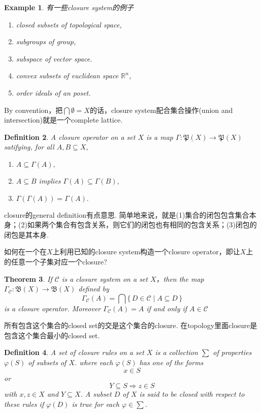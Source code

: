 \documentclass{article}
\newtheorem{theorem}{Theorem}[section]
\newtheorem{example}[theorem]{Example}
\newtheorem{definition}[theorem]{Definition}
\newcommand*{\xfunc}[4]{{#2}\colon{#3}{#1}{#4}}
\newcommand*{\func}[3]{\xfunc{\to}{#1}{#2}{#3}}
\newcommand\Set[2]{\{\,#1\mid#2\,\}} %
\begin{document}
\begin{example}
\rm 有一些closure system的例子
\begin{enumerate}
	\item closed subsets of topological space,
	\item subgroups of group,
	\item subspace of vector space.
	\item convex subsets of euclidean space $\mathbb{R}^n$,
	\item order ideals of an poset.
\end{enumerate}
\end{example}

{\color{red} By convention，把$\bigcap \emptyset = X$的话，closure system配合集合操作(union and intersection)就是一个complete lattice}.


\begin{definition}
\rm A {\color{red} closure} operator on a set $X$ is a map $\func{\Gamma}{\mathfrak{P}(X)}{\mathfrak{P}(X)}$ satifying, for all $A,B \subseteq X$,
\begin{enumerate}
	\item $A \subseteq \Gamma(A),$
	\item $A \subseteq B$ implies $\Gamma(A) \subseteq \Gamma(B),$
	\item $\Gamma(\Gamma(A)) = \Gamma(A).$
\end{enumerate}
\end{definition}

{\color{blue} closure的general definition有点意思}. 简单地来说，就是(1)集合的闭包包含集合本身；(2)如果两个集合有包含关系，则它们的闭包也有相同的包含关系；(3)闭包的闭包是其本身.

{\color{red} 如何在一个在$X$上利用已知的closure system构造一个closure operator，即让$X$上的任意一个子集对应一个closure}?

\begin{theorem}
\rm If $\mathcal{C}$ is a closure system on a set $X$，then the map $\func{\Gamma_{\mathcal{C}}}{\mathfrak{B}(X)}{\mathfrak{B}(X)}$ defined by 
$$
\Gamma_{\mathcal{C}}(A) = \bigcap \Set{D \in \mathcal{C}}{A \subseteq D}
$$
is a closure operator. Moreover $\Gamma_{\mathcal{C}}(A)=A$ if and only if $A \in \mathcal{C}$
\end{theorem}

{\color{red} 所有包含这个集合的closed set的交是这个集合的closure}. {\color{blue} 在topology里面closure是包含这个集合最小的closed set}. 

\begin{definition}
\rm A set of {\color{red} closure rules} on a set $X$ is a collection $\sum$ of properties $\varphi(S)$ of subsets of $X$. where each $\varphi(S)$ has one of the forms
$$
x \in S
$$
or 
$$ 
Y \subseteq S \Rightarrow z \in S
$$ 
with $x,z \in X$ and $Y \subseteq X$. A subset $D$ of $X$ is said to be closed with respect to these rules if $\varphi(D)$ is true for each $\varphi \in \sum$.
\end{definition}
\end{document}
